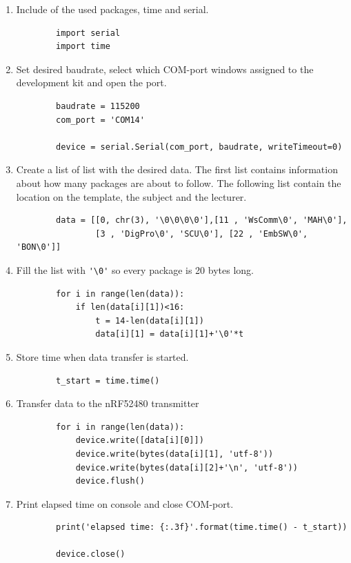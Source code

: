 \begin{enumerate}
	\item Include of the used packages, time and serial.
	\begin{lstlisting}
		import serial
		import time
	\end{lstlisting}	
	\item Set desired baudrate, select which COM-port windows assigned to the development kit and open the port.
	\begin{lstlisting}
		baudrate = 115200
		com_port = 'COM14'
		
		device = serial.Serial(com_port, baudrate, writeTimeout=0)
	\end{lstlisting}
	 \item Create a list of list with the desired data.
	 The first list contains information about how many packages are about to follow.
	 The following list contain the location on the template, the subject and the lecturer.
	 \begin{lstlisting}
	 	data = [[0, chr(3), '\0\0\0\0'],[11 , 'WsComm\0', 'MAH\0'],
	 			[3 , 'DigPro\0', 'SCU\0'], [22 , 'EmbSW\0', 'BON\0']]
	 \end{lstlisting}
	 \item Fill the list with \lstinline|'\0'| so every package is 20 bytes long.
	 \begin{lstlisting}
	 	for i in range(len(data)):
	 		if len(data[i][1])<16:
	 			t = 14-len(data[i][1])
	 			data[i][1] = data[i][1]+'\0'*t
	 \end{lstlisting}
	 \item Store time when data transfer is started.
	 \begin{lstlisting}
	 	t_start = time.time()
	 \end{lstlisting}
	 \item Transfer data to the nRF52480 transmitter
	 \begin{lstlisting}
	 	for i in range(len(data)):
	 		device.write([data[i][0]]) 
	 		device.write(bytes(data[i][1], 'utf-8'))       
	 		device.write(bytes(data[i][2]+'\n', 'utf-8'))
	 		device.flush()
	 \end{lstlisting}	
	 \item Print elapsed time on console and close COM-port.
	 \begin{lstlisting}
	 	print('elapsed time: {:.3f}'.format(time.time() - t_start))
	 	
	 	device.close()
	 \end{lstlisting}
	 
\end{enumerate}


